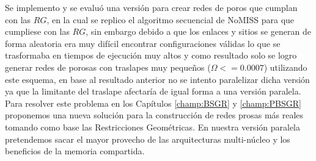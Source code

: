 Se implemento y se evaluó una versión para crear redes de poros que cumplan con las $RG$, en la cual se replico el algoritmo secuencial de NoMISS para que cumpliese con las $RG$, sin embargo debido a que los enlaces y sitios se generan de forma aleatoria era muy difícil encontrar configuraciones válidas lo que se trasformaba en tiempos de ejecución muy altos y como resultado solo se logro generar redes de porosas con traslapes muy pequeños ($\Omega<=0.0007$) utilizando este esquema, en base al resultado anterior no se intento paralelizar dicha versión ya que la limitante del traslape afectaría de igual forma a una versión paralela. Para resolver este problema en los Capítulos \ref{champ:BSGR} y \ref{champ:PBSGR} proponemos una nueva solución para la construcción de redes prosas más reales tomando como base las Restricciones Geométricas. En nuestra versión paralela pretendemos sacar el mayor provecho de las arquitecturas multi-núcleo y los beneficios de la memoria compartida.



